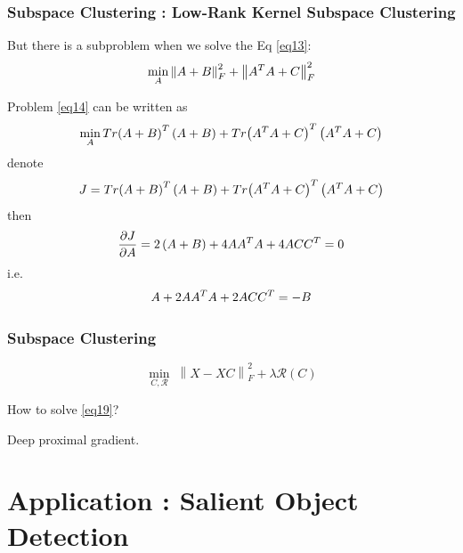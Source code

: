 \documentclass[aspectratio=2516]{beamer}
\begin{document}
\begin{frame}
\frametitle{ \small Subspace Clustering \uppercase\expandafter{}: Low-Rank Kernel Subspace Clustering}

But there is a subproblem when we solve the Eq \ref{eq13}:
\begin{equation}
\small 
\mathop {\min }\limits_A \left\| {A + B} \right\|_F^2 + \left\| {{A^T}A + C} \right\|_F^2
\label{eq14}
\end{equation}

Problem \ref{eq14} can be written as
\begin{equation}
\small 
\mathop {\min }\limits_A Tr{\left( {A + B} \right)^T}\left( {A + B} \right) + Tr{\left( {{A^T}A + C} \right)^T}\left( {{A^T}A + C} \right)
\end{equation}
denote 
\begin{equation}
\small 
J = Tr{\left( {A + B} \right)^T}\left( {A + B} \right) + Tr{\left( {{A^T}A + C} \right)^T}\left( {{A^T}A + C} \right)
\end{equation}
then 
\begin{equation}
\small 
\frac{{\partial J}}{{\partial A}} = 2\left( {A + B} \right) + 4A{A^T}A + 4AC{C^T} = 0
\end{equation}
i.e.
\begin{equation}
\small 
A + 2A{A^T}A + 2AC{C^T} =  - B
\end{equation}

\end{frame}


\begin{frame}
\frametitle{ Subspace Clustering \uppercase\expandafter{ }}

\begin{equation}
\mathop {\min }\limits_{C,\mathcal{R}} \;\left\| {X - XC} \right\|_F^2 + \lambda \mathcal{R}\left( C \right)
\label{eq19}
\end{equation}

How to solve {\color{blue} \ref{eq19}}?

\vspace{0.25cm}

Deep proximal gradient.
\end{frame}




\section{Application \uppercase\expandafter{}: Salient Object Detection}
\end{document}

